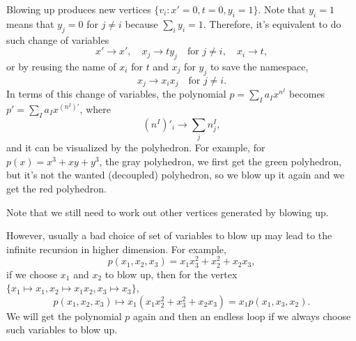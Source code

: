 \documentclass[12pt]{article}
\theoremstyle{definition}
\theoremstyle{plain}
\begin{document}
Blowing up produces new vertices 
$
	\{v_i:x'=0,t=0,y_i=1\}
$.
Note that $y_i=1$ means that $y_j=0$ for $j\neq i$ because $\sum_i y_i=1$. Therefore, it's equivalent to 
do such change of variables
\[
	x'\to x',\quad x_j\to ty_j\quad \text{for $j\neq i$},\quad x_i\to t,
\]
or by reusing the name of $x_i$ for $t$ and $x_j$ for $y_j$ to save the namespace,
\[
	x_j\to x_ix_j\quad \text{for $j\neq i$}.
\]
In terms of this change of variables, the polynomial $p=\sum_I a_I x^{n^I}$ becomes 
$p'=\sum_I a_I x^{(n^I)'}$, where
\[
	(n^I)'_i\longrightarrow \sum_j n^I_j,
\]
and it can be visualized by the polyhedron.
For example, for $p(x)=x^3+xy+y^3$, the gray polyhedron, we first get the green polyhedron, 
but it's not the wanted (decoupled) polyhedron, so we blow up it again and we get the red polyhedron.
\begin{center}
\end{center}
Note that we still need to work out other vertices generated by blowing up. 

However, usually a bad choice of set of variables to blow up may lead to the
infinite recursion in higher dimension.
For example, 
\[
	p(x_1,x_2,x_3)=x_1x_3^2+x_2^2+x_2x_3,
\]
if we choose $x_1$ and $x_2$ to blow up, then for the vertex 
$\{x_1\mapsto x_1, x_2\mapsto x_1x_2, x_3\mapsto x_3\}$,
\[
	p(x_1,x_2,x_3)\mapsto x_1(x_1x_2^2+x_3^2+x_2x_3)=x_1 p(x_1,x_3,x_2).
\]
We will get the polynomial $p$ again and then an endless loop if we always choose such
variables to blow up.
\end{document}
